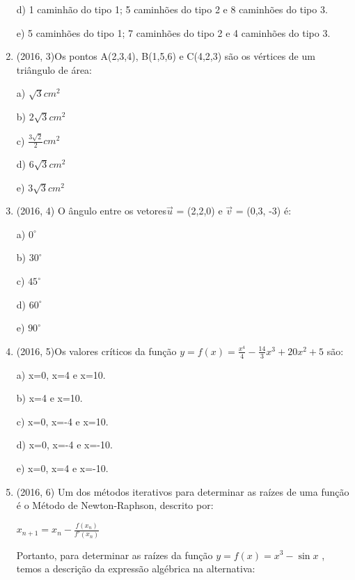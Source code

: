 \documentclass{article}
\begin{document}
\begin{enumerate}
d) 1 caminhão do tipo 1; 5 caminhões do tipo 2 e 8 caminhões do tipo 3.

e) 5 caminhões do tipo 1; 7 caminhões do tipo 2 e 4 caminhões do tipo 3.\newline




\item (2016, 3)Os pontos A(2,3,4), B(1,5,6) e C(4,2,3) são os vértices de um triângulo de área:\newline

a) $\sqrt{3} cm^2$

b) $2\sqrt{3} cm^2$

c) $\frac{3\sqrt{2}}{2} cm^2$

d) $6\sqrt{3} cm^2$

e) $3\sqrt{3} cm^2$\newline



\item (2016, 4) O ângulo entre os vetores$\vec u $ = (2,2,0) e $\vec v$ = (0,3, -3) é:\newline

a) $ 0^\circ$

b) $ 30^\circ$

c) $ 45^\circ$

d) $ 60^\circ$

e) $ 90^\circ$ \newline



\item (2016, 5)Os valores críticos da função $y=f(x)=\frac{x^4}{4}-\frac{14}{3}x^3 + 20x^2 + 5$ são:

a) x=0, x=4 e x=10.

b) x=4 e x=10.

c) x=0, x=-4 e x=10.

d) x=0, x=-4 e x=-10.

e) x=0, x=4 e x=-10.\newline


\item (2016, 6) Um dos métodos iterativos para determinar as raízes de uma função é o Método de
Newton-Raphson, descrito por:\newline

$x_{n+1}=x_n -\frac{f(x_n)}{f'(x_n)} $\newline

Portanto, para determinar as raízes da função $ y = f(x) = x^3 -\sin{x}$ , temos a descrição da expressão algébrica na alternativa:\newline


\end{enumerate}
\end{document}
